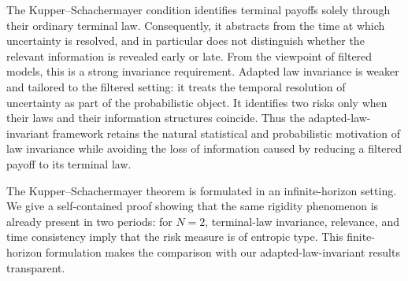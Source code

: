 \documentclass[a4paper]{amsart}
\theoremstyle{definition}
\begin{document}
The Kupper--Schachermayer condition identifies terminal payoffs solely through
their ordinary terminal law. Consequently, it abstracts from the time at which
uncertainty is resolved, and in particular does not distinguish whether the
relevant information is revealed early or late. From the viewpoint of filtered
models, this is a strong invariance requirement.
Adapted law invariance is weaker and tailored to the filtered setting:
it treats the temporal resolution of uncertainty as part of the probabilistic
object.
It
identifies two risks only when their laws and their information structures
coincide. Thus the adapted-law-invariant framework retains the natural
statistical and probabilistic motivation of law invariance while avoiding the
loss of information caused by reducing a filtered payoff to its terminal law. 


The Kupper--Schachermayer theorem is formulated in an infinite-horizon setting.
We give a self-contained proof showing that the same rigidity phenomenon is
already present in two periods: for \(N=2\), terminal-law invariance, relevance,
and time consistency imply that the risk measure is of entropic type. This
finite-horizon formulation makes the comparison with our adapted-law-invariant
results transparent.

\medskip
\end{document}
